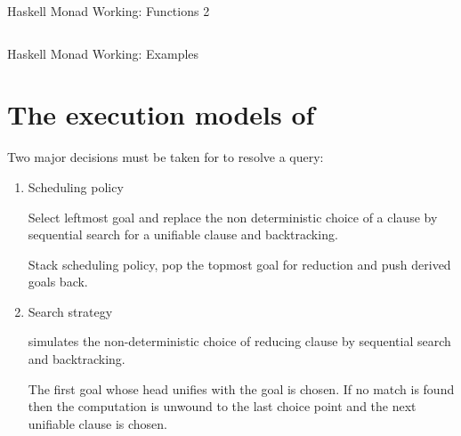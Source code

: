 \documentclass[proposal.tex]{subfiles}
\begin{document}
\begin{code-list}[H]
  \begin{singlespace}
    \inputminted[linenos, firstline=60, lastline=94]{haskell}{haskell-monad-working-2.hs}
  \end{singlespace}
  \caption{Haskell Monad Working: Functions 2}
\label{tab:hskllmndworkngfunctions2}
\end{code-list}

\begin{code-list}[H]
  \begin{singlespace}
    \inputminted[linenos, firstline=97, lastline=123]{haskell}{haskell-monad-working-2.hs}
  \end{singlespace}
  \caption{Haskell Monad Working: Examples}
\label{tab:hskllmndworkngexamples}
\end{code-list}


\section[{The execution models of \progLang{Prolog}}]{The execution models of  \cite{Sterling:1994:APA:175753}}\label{sec:exec-models-prolog}


Two major decisions must be taken for  to resolve a query:
\begin{enumerate}
\item Scheduling policy

Select leftmost goal and replace the non deterministic choice of a clause by sequential search for a unifiable clause and backtracking.

Stack scheduling policy, pop the topmost goal for reduction and push derived goals back.

\item Search strategy

 simulates the non-deterministic choice of reducing clause by sequential search and backtracking. 

The first goal whose head unifies with the goal is chosen. If no match is found then the computation is unwound to the last choice point and
the next unifiable clause is chosen.
\end{enumerate}
\end{document}
